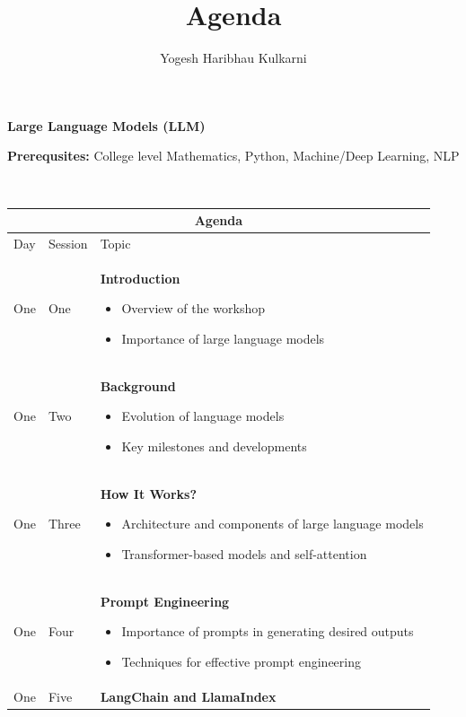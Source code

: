 \documentclass[a4paper, 11pt]{article}
\title{Agenda}
\author{Yogesh Haribhau Kulkarni}
\begin{document}
\pagestyle{mystyle}

\makebox[\linewidth]{\rule{\linewidth}{1pt}}
\begin{center} 
\textbf{\Large Large Language Models (LLM)}
\end{center}
\makebox[\linewidth]{\rule{\linewidth}{1pt}}

\textbf{Prerequsites:}  College level Mathematics, Python, Machine/Deep Learning, NLP

\makebox[\linewidth]{\rule{\linewidth}{0.4pt}}\\

\begin{center} 
\begin{tabular}{ |p{1cm}|p{1cm}||p{10cm}|  }
 \hline
 \multicolumn{3}{|c|}{\textbf{\large Agenda}} \\
 \hline
Day & Session & Topic\\
 \hline
One	&	One  		& 	\textbf{Introduction}
\begin{itemize}[topsep=0pt, partopsep=0pt, itemsep=0pt, parsep=0pt]
\item Overview of the workshop
\item Importance of large language models
\end{itemize}
\\
One 	&   	Two  		&   	\textbf{Background}
\begin{itemize}[topsep=0pt, partopsep=0pt, itemsep=0pt, parsep=0pt]
\item Evolution of language models
\item Key milestones and developments
\end{itemize}
\\
One	&  	Three    	& 	\textbf{How It Works?}
\begin{itemize}[topsep=0pt, partopsep=0pt, itemsep=0pt, parsep=0pt]
\item Architecture and components of large language models
\item Transformer-based models and self-attention
\end{itemize}
\\
One 	&   	Four  		&   	\textbf{Prompt Engineering}
\begin{itemize}[topsep=0pt, partopsep=0pt, itemsep=0pt, parsep=0pt]
\item Importance of prompts in generating desired outputs
\item Techniques for effective prompt engineering
\end{itemize}
\\
One	&  	Five		&  	\textbf{LangChain and LlamaIndex}

\end{tabular}
\end{center}
\end{document}
